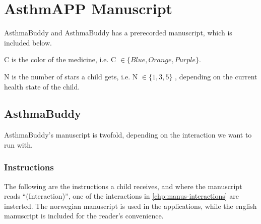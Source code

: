 \chapter{AsthmAPP Manuscript}
\label{chp:anuscript} %

AsthmaBuddy and AsthmaBuddy has a prerecorded manuscript, which is included below. 


C is the color of the medicine, i.e. C $\in \{ Blue, Orange, Purple \}$.


N is the number of stars a child gets, i.e. N $\in \{ 1, 3, 5 \}$ , depending on the current health state of the child.  


\section{AsthmaBuddy}
AsthmaBuddy's manuscript is twofold, depending on the interaction we want to run with.
\subsection{Instructions}
The following are the instructions a child receives, and where the manuscript reads ``(Interaction)'', one of the interactions in \ref{chp:manus-interactions} are insterted. The norwegian manuscript is used in the applications, while the english manuscript is included for the reader's convenience. 

